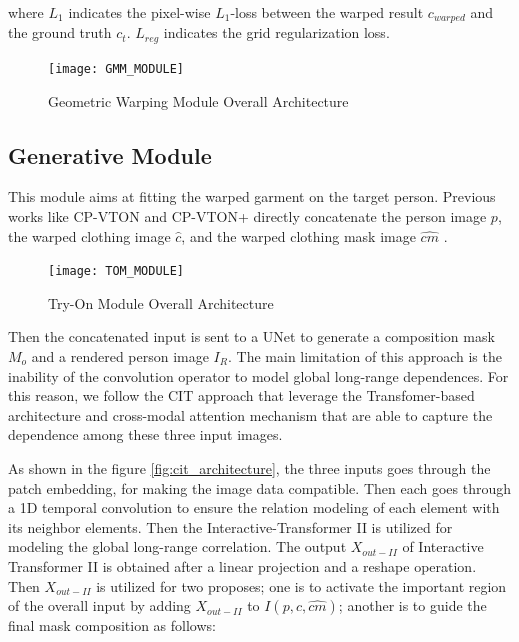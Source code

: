 where $L_1$ indicates the pixel-wise $L_1$-loss between the warped result $c_{warped}$ and the ground truth $c_t$. $L_{reg}$ indicates the grid regularization loss.

\begin{figure}[h]
\centering
\texttt{[image: GMM\_MODULE]}
\caption{Geometric Warping Module Overall Architecture}
\label{fig:GMM_MODULE}
\end{figure}



\subsection{Generative Module}

This module aims at fitting the warped garment on the target person. Previous works like CP-VTON and CP-VTON+ directly concatenate the person image $p$, the warped clothing image
$\hat{c}$, and the warped clothing mask image $\hat{cm}$ . 

\begin{figure}[h]
\centering
\texttt{[image: TOM\_MODULE]}
\caption{Try-On Module Overall Architecture}
\label{fig:TOM_MODULE}
\end{figure}

Then the concatenated input is sent to a UNet \cite{u-net} to generate a composition mask $M_o$ and a rendered person image $I_R$. The main limitation of this approach is the inability of the convolution operator to model global long-range dependences. For this reason, we follow the CIT \cite{CIT} approach that leverage the Transfomer-based architecture and cross-modal attention mechanism that are able to capture the dependence among these three input images.


As shown in the figure \ref{fig:cit_architecture}, the three inputs goes through the patch embedding, for making the image data compatible.  Then each goes through a 1D temporal convolution to ensure the relation modeling of each element with its neighbor elements. Then the Interactive-Transformer II is utilized for modeling the global long-range correlation. The output $X_{out-II}$ of Interactive Transformer II is obtained after a linear projection and a reshape operation. Then $X_{out-II}$ is utilized for two proposes; one is to activate the important region of the overall input by adding $X_{out-II}$ to $I(p,\hat{c},\hat{cm})$; another is to guide the final mask composition as follows:

